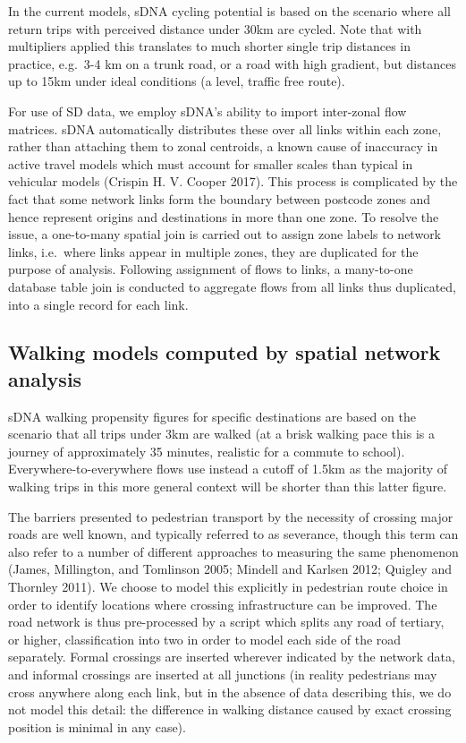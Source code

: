 \documentclass[galley]{jtlu-article-2col}
\begin{document}
In the current models, sDNA cycling potential is based on the scenario where all return trips with perceived distance under 30km are cycled.
Note that with multipliers applied this translates to much shorter single trip distances in practice, e.g.~3-4 km on a trunk road, or a road with high gradient, but distances up to 15km under ideal conditions (a level, traffic free route).

For use of SD data, we employ sDNA's ability to import inter-zonal flow matrices. sDNA automatically distributes these over all links within each zone, rather than attaching them to zonal centroids, a known cause of inaccuracy in active travel models which must account for smaller scales than typical in vehicular models (Crispin H. V. Cooper 2017).
This process is complicated by the fact that some network links form the boundary between postcode zones and hence represent origins and destinations in more than one zone.
To resolve the issue, a one-to-many spatial join is carried out to assign zone labels to network links, i.e.~where links appear in multiple zones, they are duplicated for the purpose of analysis.
Following assignment of flows to links, a many-to-one database table join is conducted to aggregate flows from all links thus duplicated, into a single record for each link.

\hypertarget{walking-models-computed-by-spatial-network-analysis}{%
\subsection{Walking models computed by spatial network analysis}\label{walking-models-computed-by-spatial-network-analysis}}

sDNA walking propensity figures for specific destinations are based on the scenario that all trips under 3km are walked (at a brisk walking pace this is a journey of approximately 35 minutes, realistic for a commute to school).
Everywhere-to-everywhere flows use instead a cutoff of 1.5km as the majority of walking trips in this more general context will be shorter than this latter figure.

The barriers presented to pedestrian transport by the necessity of crossing major roads are well known, and typically referred to as severance, though this term can also refer to a number of different approaches to measuring the same phenomenon (James, Millington, and Tomlinson 2005; Mindell and Karlsen 2012; Quigley and Thornley 2011).
We choose to model this explicitly in pedestrian route choice in order to identify locations where crossing infrastructure can be improved.
The road network is thus pre-processed by a script which splits any road of tertiary, or higher, classification into two in order to model each side of the road separately.
Formal crossings are inserted wherever indicated by the network data, and informal crossings are inserted at all junctions (in reality pedestrians may cross anywhere along each link, but in the absence of data describing this, we do not model this detail: the difference in walking distance caused by exact crossing position is minimal in any case).
\end{document}
